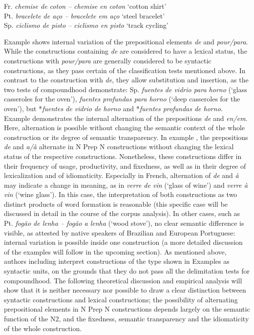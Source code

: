 \documentclass[output=paper]{langsci/langscibook}
\begin{document}
\ea \label{ex:hennecke:3}
  \ea\label{ex:hennecke:3a} Fr. \textit{chemise de coton – chemise en coton}   `cotton shirt' \\ 
  \ex\label{ex:hennecke:3b} Pt. \textit{bracelete de aço – bracelete em aço}  `steel bracelet' \\ 
  \ex\label{ex:hennecke:3c} Sp. \textit{ciclismo de pisto – ciclismo en pisto}   `track cycling' \\ 
  \z
\z
 
Example  shows internal variation of the prepositional elements \textit{de} and \textit{pour/para}. While the constructions containing \textit{de} are considered to have a lexical status, the constructions with \textit{pour/para} are generally considered to be syntactic constructions, as they pass certain of the classification tests mentioned above. In contrast to the construction with \textit{de}, they allow substitution and insertion, as the two tests of compoundhood demonstrate: Sp. \textit{fuentes de vidrio para horno} (`glass casseroles for the oven'), \textit{fuentes profundas para horno} (`deep casseroles for the oven'), but *\textit{fuentes de vidrio de horno} and *\textit{fuentes profundas de horno}. Example  demonstrates the internal alternation of the prepositions \textit{de} and \textit{en/em}. Here, alternation is possible without changing the semantic context of the whole construction or its degree of semantic transparency. In example , the prepositions \textit{de} and \textit{a/à} alternate in N Prep N constructions without changing the lexical status of the respective constructions. Nonetheless, these constructions differ in their frequency of usage, productivity, and fixedness, as well as in their degree of lexicalization and of idiomaticity. Especially in French, alternation of \textit{de} and \textit{à} may indicate a change in meaning, as in \textit{verre de vin} (`glass of wine') and \textit{verre à vin} (`wine glass'). In this case, the interpretation of both constructions as two distinct products of word formation is reasonable (this specific case will be discussed in detail in the course of the corpus analysis). In other cases, such as Pt. \textit{fogão de lenha – fogão a lenha} (`wood stove'), no clear semantic difference is visible, as attested by native speakers of Brazilian and European Portuguese: internal variation is possible inside one construction (a more detailed discussion of the examples will follow in the upcoming section). As mentioned above, authors including \citet{RioTorto:2009} interpret constructions of the type shown in Examples  as syntactic units, on the grounds that they do not pass all the delimitation tests for compoundhood. The following theoretical discussion and empirical analysis will show that it is neither necessary nor possible to draw a clear distinction between syntactic constructions and lexical constructions; the possibility of alternating prepositional elements in N Prep N constructions depends largely on the semantic function of the N2, and the fixedness, semantic transparency and the idiomaticity of the whole construction.
  
\end{document}
